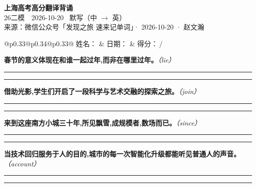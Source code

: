 \documentclass[11pt,a4paper]{article}
\newcommand{\num}[1]{\makebox[1.9em][r]{#1.}\hspace{0.3em}}
\newcommand{\wline}{\noindent\rule{\linewidth}{0.4pt}}
\newcommand{\prompt}[1]{\emph{\textcolor{tipblue}{\small（#1）}}}
\begin{document}
\pagestyle{plain}
\begin{center}
{\LARGE\bfseries 上海高考高分翻译背诵 }\\[0.25em]
{\large 26二模　2026-10-20 \quad\ 默写（中 $\to$ 英）}\\[0.35em]
{\footnotesize 来源：微信公众号「发现之旅 速来记单词」· 2026-10-20 · 赵文瀚}
\end{center}

\vspace{0.4em}
\noindent\begin{tabular}{@{}p{0.33\textwidth}@{}p{0.34\textwidth}@{}p{0.33\textwidth}@{}}
姓名：\underline{\hspace{2.0cm}} & 日期：\underline{\hspace{2.0cm}} & 得分：\underline{\hspace{1.4cm}}\,/ \\
\end{tabular}

\vspace{0.5em}

\vspace{0.8em}
\num{1}\textbf{春节的意义体现在和谁一起过年,而非在哪里过年。}\prompt{lie}

\vspace{0.3em}

\wline\vspace{0.3em}
\wline

\num{2}\textbf{借助光影,学生们开启了一段科学与艺术交融的探索之旅。}\prompt{join}

\vspace{0.3em}

\wline\vspace{0.3em}
\wline

\num{3}\textbf{来到这座南方小城三十年,所见飘雪,成规模者,数场而已。}\prompt{since}

\vspace{0.3em}

\wline\vspace{0.3em}
\wline

\num{4}\textbf{当技术回归服务于人的目的,城市的每一次智能化升级都能听见普通人的声音。}\prompt{account}

\vspace{0.3em}

\wline\vspace{0.3em}
\wline
\end{document}
